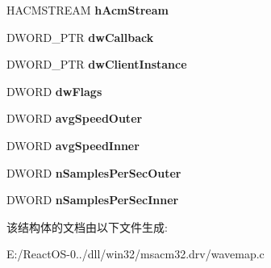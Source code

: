 \begin{DoxyCompactItemize}
\begin{tabbing}
\end{tabbing}\item 
\mbox{\label{structtag_w_a_v_e_m_a_p_d_a_t_a_ab498a4e23c0a2f1b4c799734dbd03f7c}} 
H\+A\+C\+M\+S\+T\+R\+E\+AM {\bfseries h\+Acm\+Stream}
\item 
\mbox{\label{structtag_w_a_v_e_m_a_p_d_a_t_a_ad513e7b27992258332c672a7c0a56cb1}} 
D\+W\+O\+R\+D\+\_\+\+P\+TR {\bfseries dw\+Callback}
\item 
\mbox{\label{structtag_w_a_v_e_m_a_p_d_a_t_a_a8f7c17dd0ecfc5b713072ac1b6110398}} 
D\+W\+O\+R\+D\+\_\+\+P\+TR {\bfseries dw\+Client\+Instance}
\item 
\mbox{\label{structtag_w_a_v_e_m_a_p_d_a_t_a_a1fcb3b0a0200c3f73231285ffa847d45}} 
D\+W\+O\+RD {\bfseries dw\+Flags}
\item 
\mbox{\label{structtag_w_a_v_e_m_a_p_d_a_t_a_aa6e598208c51b6be320fb949c0f9c6ff}} 
D\+W\+O\+RD {\bfseries avg\+Speed\+Outer}
\item 
\mbox{\label{structtag_w_a_v_e_m_a_p_d_a_t_a_ab65ec9ede718557519ff8a4b76c5d173}} 
D\+W\+O\+RD {\bfseries avg\+Speed\+Inner}
\item 
\mbox{\label{structtag_w_a_v_e_m_a_p_d_a_t_a_a2e5aa65650c8c28a900215c84daf8ee3}} 
D\+W\+O\+RD {\bfseries n\+Samples\+Per\+Sec\+Outer}
\item 
\mbox{\label{structtag_w_a_v_e_m_a_p_d_a_t_a_ab98d4c8b376bd3901dbcbc1a75874866}} 
D\+W\+O\+RD {\bfseries n\+Samples\+Per\+Sec\+Inner}
\end{DoxyCompactItemize}


该结构体的文档由以下文件生成\+:\begin{DoxyCompactItemize}
\item 
E\+:/\+React\+O\+S-\/0../dll/win32/msacm32.\+drv/wavemap.\+c\end{DoxyCompactItemize}
